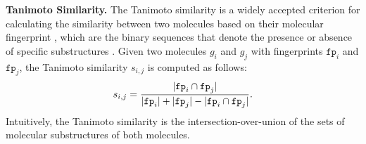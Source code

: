 



\noindent \textbf{Tanimoto Similarity.}
The Tanimoto similarity is a widely accepted criterion for calculating the similarity between two molecules based on their molecular fingerprint \cite{bajusz2015tanimoto}, which are the binary sequences that denote the presence or absence of specific substructures \cite{rogers2010extended}.
Given two molecules $g_i$ and $g_j$ with fingerprints $\mathtt{fp}_i$ and $\mathtt{fp}_j$, the Tanimoto similarity $s_{i,j}$ is computed as follows:
\begin{equation}
\small
s_{i,j} = \frac{|\mathtt{fp}_i \cap \mathtt{fp}_j|}{|\mathtt{fp}_i| + |\mathtt{fp}_j| -  |\mathtt{fp}_i \cap \mathtt{fp}_j|}.
\label{eq: Tanimoto}
\end{equation}
Intuitively, the Tanimoto similarity is the intersection-over-union of the sets of molecular substructures of both molecules.

